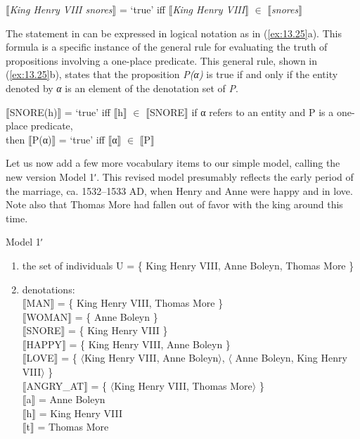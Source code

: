 \ea \label{ex:13.24}
{}$\llbracket$\textit{King Henry VIII snores}$\rrbracket$  = ‘true’  iff  $\llbracket$\textit{King Henry VIII}$\rrbracket$  ${\in}$ $\llbracket$\textit{snores}$\rrbracket$ 
\z


The statement in  can be expressed in logical notation as in (\ref{ex:13.25}a). This formula is a specific instance of the general rule for evaluating the truth of propositions involving a one-place predicate. This general rule, shown in (\ref{ex:13.25}b), states that the proposition \textit{P(α)} is true if and only if the entity denoted by \textit{α} is an element of the denotation set of \textit{P}.

\ea \label{ex:13.25}
\ea  $\llbracket$SNORE(h)$\rrbracket$  = ‘true’  iff  $\llbracket$h$\rrbracket$  ${\in}$ $\llbracket$SNORE$\rrbracket$ 
\ex  if α refers to an entity and P is a one-place predicate,\\
  then  $\llbracket$P(α)$\rrbracket$  = ‘true’  iff  $\llbracket$α$\rrbracket$  ${\in}$ $\llbracket$P$\rrbracket$ 
\z \z


Let us now add a few more vocabulary items to our simple model, calling the new version Model 1ʹ. This revised model presumably reflects the early period of the marriage, ca. 1532--1533 AD, when Henry and Anne were happy and in love. Note also that Thomas More had fallen out of favor with the king around this time.


\ea \label{ex:13.26} Model 1ʹ\\
\begin{enumerate}[label=\roman*.]
\item the set of individuals U = \{ King Henry VIII, Anne Boleyn, Thomas More \}
\item denotations\textsc{:\\
{}$\llbracket$}\textsc{MAN}$\rrbracket$  = \{ King Henry VIII, Thomas More \}\\
\textsc{$\llbracket$}WOMAN$\rrbracket$  = \{ Anne Boleyn \}\\
\textsc{$\llbracket$}SNORE$\rrbracket$  = \{ King Henry VIII \}\\
\textsc{$\llbracket$}HAPPY$\rrbracket$  = \{ King Henry VIII, Anne Boleyn \}\\
\textsc{$\llbracket$}LOVE$\rrbracket$  = \{ $\langle$King Henry VIII, Anne Boleyn$\rangle$, $\langle$ Anne Boleyn, King Henry VIII$\rangle$ \}\\
\textsc{$\llbracket$}ANGRY\_AT$\rrbracket$  = \{ $\langle$King Henry VIII, Thomas More$\rangle$ \}\\
\textsc{$\llbracket$}a$\rrbracket$  = Anne Boleyn\\
\textsc{$\llbracket$}h$\rrbracket$  = King Henry VIII\\
\textsc{$\llbracket$}t$\rrbracket$  = Thomas More
\end{enumerate}
\z

